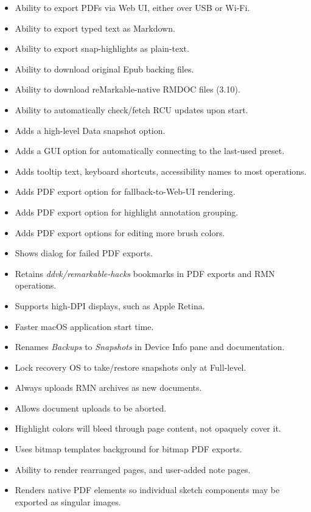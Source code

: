 {\begin{itemize}
  \item{Ability to export PDFs via Web UI, either over USB or Wi-Fi.}
  \item{Ability to export typed text as Markdown.}
  \item{Ability to export snap-highlights as plain-text.}
  \item{Ability to download original Epub backing files.}
  \item{Ability to download reMarkable-native RMDOC files (3.10).}
  \item{Ability to automatically check/fetch RCU updates upon start.}
  \item{Adds a high-level Data snapshot option.}
  \item{Adds a GUI option for automatically connecting to the last-used preset.}
  \item{Adds tooltip text, keyboard shortcuts, accessibility names to most operations.}
  \item{Adds PDF export option for fallback-to-Web-UI rendering.}
  \item{Adds PDF export option for highlight annotation grouping.}
  \item{Adds PDF export options for editing more brush colors.}
  \item{Shows dialog for failed PDF exports.}
  \item{Retains \textit{ddvk/remarkable-hacks} bookmarks in PDF exports and RMN operations.}
  \item{Supports high-DPI displays, such as Apple Retina.}
  \item{Faster macOS application start time.}
  \item{Renames \textit{Backups} to \textit{Snapshots} in Device Info pane and documentation.}
  \item{Lock recovery OS to take/restore snapshots only at Full-level.}
  \item{Always uploads RMN archives as new documents.}
  \item{Allows document uploads to be aborted.}
  \item{Highlight colors will bleed through page content, not opaquely cover it.}
  \item{Uses bitmap templates background for bitmap PDF exports.}
  \item{Ability to render rearranged pages, and user-added note pages.}
  \item{Renders native PDF elements so individual sketch components may be exported as singular images.}

\end{itemize}}
